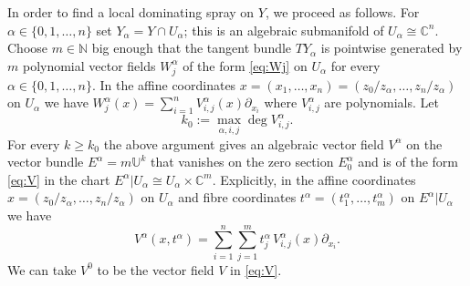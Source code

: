 \documentclass[12pt]{amsart}
\theoremstyle{definition}
\numberwithin{equation}{section}
\numberwithin{figure}{section}
\newcommand\C{\mathbb{C}}
\newcommand\N{\mathbb{N}}
\newcommand\U{\mathbb{U}}
\newcommand\di{\partial}
\numberwithin{equation}{section}
\begin{document}
In order to find a local dominating spray on $Y$, we proceed as follows.
For $\alpha\in\{0,1,\ldots,n\}$ set $Y_\alpha=Y\cap U_\alpha$;
this is an algebraic submanifold of $U_\alpha\cong\C^n$. 
Choose $m\in\N$ big enough that the tangent bundle $TY_\alpha$
is pointwise generated by $m$ polynomial vector fields 
$W^\alpha_j$ of the form \eqref{eq:Wj} on $U_\alpha$ for every 
$\alpha\in\{0,1,\ldots,n\}$. In the affine coordinates
$x=(x_1,\ldots,x_n)=(z_0/z_\alpha,\ldots,z_n/z_\alpha)$ on $U_\alpha$ 
we have $W^\alpha_j(x) = \sum_{i=1}^n V^\alpha_{i,j}(x) \di_{x_i}$
where $V^\alpha_{i,j}$ are polynomials. Let 
\begin{equation}\label{eq:k0}
	k_0 := \max_{\alpha,i,j} \deg V^\alpha_{i,j}. 
\end{equation}
For every $k\ge k_0$ the above argument gives an algebraic vector field
$V^\alpha$ on the vector bundle $E^\alpha=m\U^k$ 
that vanishes on the zero section $E^\alpha_0$ and is 
of the form \eqref{eq:V} in the 
chart $E^\alpha|U_\alpha\cong U_\alpha\times \C^m$.
Explicitly, in the affine coordinates
$x=(z_0/z_\alpha,\ldots,z_n/z_\alpha)$ on $U_\alpha$
and fibre coordinates $t^\alpha=(t^\alpha_1,\ldots,t^\alpha_m)$ 
on $E^\alpha|U_\alpha$ we have 
\[ 
	V^\alpha(x,t^\alpha) = 
	\sum_{i=1}^n \sum_{j=1}^m t^\alpha_j \, V^\alpha_{i,j}(x) \di_{x_i}.
\] 
We can take $V^0$ to be the vector field $V$ in \eqref{eq:V}.
\end{document}
